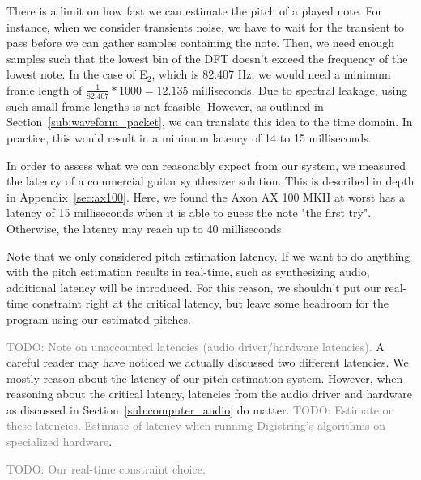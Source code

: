 \documentclass[10pt,twocolumn]{article}
\newcommand{\note}[2]{#1${}_{#2}$}
\begin{document}
There is a limit on how fast we can estimate the pitch of a played note. For instance, when we consider transients noise, we have to wait for the transient to pass before we can gather samples containing the note. Then, we need enough samples such that the lowest bin of the DFT doesn't exceed the frequency of the lowest note. In the case of \note{E}{2}, which is 82.407 Hz, we would need a minimum frame length of $ \frac{1}{82.407} * 1000 = 12.135 $ milliseconds. Due to spectral leakage, using such small frame lengths is not feasible. However, as outlined in Section~\ref{sub:waveform_packet}, we can translate this idea to the time domain. In practice, this would result in a minimum latency of 14 to 15 milliseconds.

In order to assess what we can reasonably expect from our system, we measured the latency of a commercial guitar synthesizer solution. This is described in depth in Appendix~\ref{sec:ax100}. Here, we found the Axon AX 100 MKII at worst has a latency of 15 milliseconds when it is able to guess the note "the first try". Otherwise, the latency may reach up to 40 milliseconds.

Note that we only considered pitch estimation latency. If we want to do anything with the pitch estimation results in real-time, such as synthesizing audio, additional latency will be introduced. For this reason, we shouldn't put our real-time constraint right at the critical latency, but leave some headroom for the program using our estimated pitches.

\textcolor{gray}{TODO: Note on unaccounted latencies (audio driver/hardware latencies).}
A careful reader may have noticed we actually discussed two different latencies. We mostly reason about the latency of our pitch estimation system. However, when reasoning about the critical latency, latencies from the audio driver and hardware as discussed in Section~\ref{sub:computer_audio} do matter. \textcolor{gray}{TODO: Estimate on these latencies. Estimate of latency when running Digistring's algorithms on specialized hardware}.

\textcolor{gray}{TODO: Our real-time constraint choice.}


\end{document}
